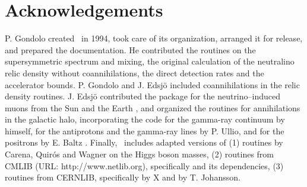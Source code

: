 
\chapter*{Acknowledgements}

P. Gondolo created \ds\ in 1994, took care of its organization,
arranged it for release, and prepared the documentation. He contributed
\cite{bergstrom96} the routines on the supersymmetric spectrum and mixing, the
original calculation of the neutralino relic density without coannihilations,
the direct detection rates and the accelerator bounds. P. Gondolo and J.
Edsj\"o \cite{edsjo97} included coannihilations in the relic density routines.
J. Edsj\"o contributed the package for the neutrino--induced muons from the Sun
and the Earth \cite{edsjo95+}, and organized the routines for annihilations in
the galactic halo, incorporating the code for the gamma-ray continuum by
himself, for the antiprotons \cite{bergstrom99} and the gamma-ray lines
\cite{bergstrom97+} by P. Ullio, and for the positrons by E.  Baltz
\cite{baltz99}. Finally, \ds\ includes adapted versions of (1)
routines by Carena, Quir\'os and Wagner on the Higgs boson masses, (2) routines
from CMLIB (URL: http://www.netlib.org), specifically  and its
dependencies, (3) routines from CERNLIB, specifically  by X and
 by T. Johansson.


